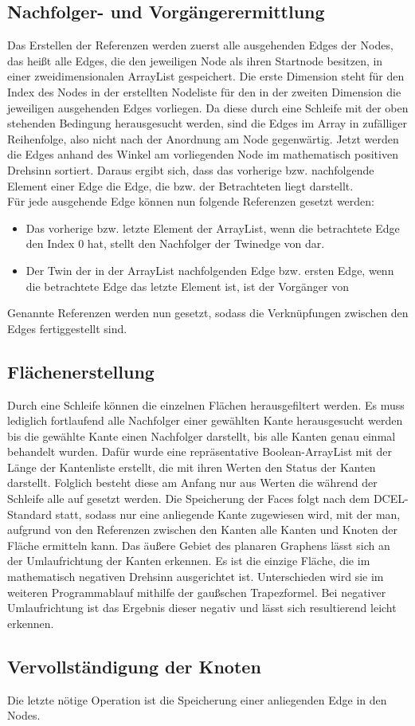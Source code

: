 \subsection{Nachfolger- und Vorgängerermittlung}
Das Erstellen der Referenzen werden zuerst alle ausgehenden Edges der Nodes, das heißt alle Edges, die den jeweiligen Node als ihren Startnode besitzen, in einer zweidimensionalen ArrayList gespeichert.
Die erste Dimension steht für den Index des Nodes in der erstellten Nodeliste für den in der zweiten Dimension die jeweiligen ausgehenden Edges vorliegen.
Da diese durch eine  Schleife mit der oben stehenden Bedingung herausgesucht werden, sind die Edges im Array in zufälliger Reihenfolge, also nicht nach der Anordnung am Node gegenwärtig.
Jetzt werden die Edges anhand des  Winkel am vorliegenden Node im mathematisch positiven Drehsinn sortiert.
Daraus ergibt sich, dass das vorherige bzw. nachfolgende Element einer Edge die Edge, die  bzw.  der Betrachteten liegt darstellt.\\
Für jede ausgehende Edge  können nun folgende Referenzen gesetzt werden:
\begin{itemize}
	\item Das vorherige bzw. letzte Element der ArrayList, wenn die betrachtete Edge den Index 0 hat, stellt den Nachfolger der Twinedge von  dar.
	\item Der Twin der in der ArrayList nachfolgenden Edge bzw. ersten Edge, wenn die betrachtete Edge das letzte Element ist, ist der Vorgänger von 
\end{itemize}
Genannte Referenzen werden nun gesetzt, sodass die Verknüpfungen zwischen den Edges fertiggestellt sind.
\subsection{Flächenerstellung}
Durch eine Schleife können die einzelnen Flächen herausgefiltert werden.
Es muss lediglich fortlaufend alle Nachfolger einer gewählten Kante herausgesucht werden bis die gewählte Kante einen Nachfolger darstellt, bis alle Kanten genau einmal behandelt wurden.
Dafür wurde eine repräsentative Boolean-ArrayList mit der Länge der Kantenliste erstellt, die mit ihren Werten den Status der Kanten darstellt.
Folglich besteht diese am Anfang nur aus  Werten die während der Schleife alle auf  gesetzt werden.
Die Speicherung der Faces folgt nach dem DCEL-Standard statt, sodass nur eine anliegende Kante zugewiesen wird, mit der man, aufgrund von den Referenzen zwischen den Kanten alle Kanten und Knoten der Fläche ermitteln kann.
Das äußere Gebiet des planaren Graphens lässt sich an der Umlaufrichtung der Kanten erkennen.
Es ist die einzige Fläche, die im mathematisch negativen Drehsinn ausgerichtet ist.
Unterschieden wird sie im weiteren Programmablauf mithilfe der gaußschen Trapezformel.
Bei negativer Umlaufrichtung ist das Ergebnis dieser negativ und lässt sich resultierend leicht erkennen.

\subsection{Vervollständigung der Knoten}
Die letzte nötige Operation ist die Speicherung einer anliegenden Edge in den Nodes.